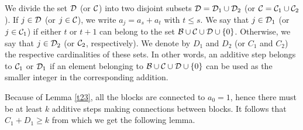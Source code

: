 \documentclass{article}
\theoremstyle{definition}
\newtheorem{definition}{Definition}[section]
\begin{document}





We divide the set ${\cal D}$ (or ${\cal C}$) into two disjoint subsets ${\cal D}={\cal D}_1\cup {\cal D}_2$  (or ${\cal C}={\cal C}_1\cup {\cal C}_2$). If $j\in {\cal D}$ (or $j\in {\cal C}$), we write $a_j=a_s+a_t$ with $t\le s$.  We say that $j\in {\cal D}_1$ (or $j\in {\cal C}_1$) if either $t$ or $t+1$ can belong to the set ${\cal B}\cup {\cal C}\cup {\cal D}\cup \{0\}$. Otherwise, we say that $j\in {\cal D}_2$ (or ${\cal C}_2$, respectively). We denote by $D_1$ and $D_2$ (or $C_1$ and $C_2$) the respective cardinalities of these sets.  In other words, an additive step belongs to ${\cal C}_1$ or ${\cal D}_1$ if an element belonging to ${\cal B}\cup {\cal C}\cup {\cal D}\cup\{0\}$ can be used as the smaller integer in the corresponding addition.

Because of Lemma \ref{t23}, all the blocks are connected to $a_0=1$, hence there must be at least $k$ additive steps making connections between blocks. It follows that $C_1+D_1\ge k$ from which we get the following lemma. 
\end{document}
